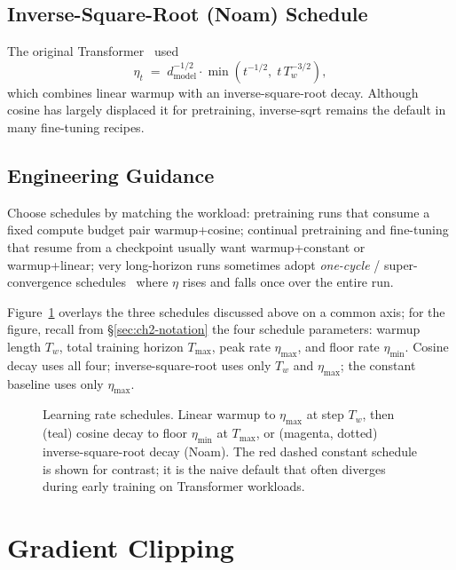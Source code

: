 \subsection{Inverse-Square-Root (Noam) Schedule}

The original Transformer~\citep{vaswani2017attention} used
\begin{equation}
\eta_t \;=\; d_{\mathrm{model}}^{-1/2} \cdot
            \min\!\left(t^{-1/2},\; t\, T_w^{-3/2}\right),
\end{equation}
which combines linear warmup with an inverse-square-root decay.
Although cosine has largely displaced it for pretraining, inverse-sqrt
remains the default in many fine-tuning recipes.

\subsection{Engineering Guidance}

Choose schedules by matching the workload:
pretraining runs that consume a fixed compute budget pair warmup+cosine;
continual pretraining and fine-tuning that resume from a checkpoint
usually want warmup+constant or warmup+linear; very long-horizon runs
sometimes adopt \emph{one-cycle} / super-convergence
schedules~\citep{smith2018superconvergence} where $\eta$ rises and falls
once over the entire run.

Figure~\ref{fig:lr_schedule} overlays the three schedules discussed
above on a common axis; for the figure, recall from
\S\ref{sec:ch2-notation} the four schedule parameters:
warmup length $T_w$, total training horizon $T_{\max}$, peak rate
$\eta_{\max}$, and floor rate $\eta_{\min}$. Cosine decay uses all
four; inverse-square-root uses only $T_w$ and $\eta_{\max}$; the
constant baseline uses only $\eta_{\max}$.

\begin{figure}[H]
  \centering
  
  \caption{Learning rate schedules. Linear warmup to $\eta_{\max}$ at
           step $T_w$, then (teal) cosine decay to floor $\eta_{\min}$
           at $T_{\max}$, or (magenta, dotted) inverse-square-root
           decay (Noam). The red dashed constant schedule is shown
           for contrast; it is the naive default that often diverges
           during early training on Transformer workloads.}
  \label{fig:lr_schedule}
\end{figure}

\section{Gradient Clipping}


